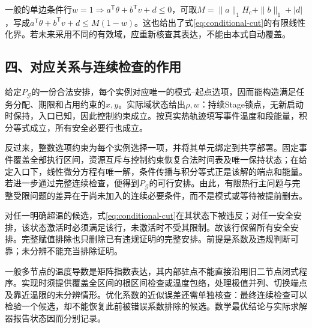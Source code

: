 一般的单边条件行\(w=1\Rightarrow a^{\mathsf T}\theta+b^{\mathsf T}v+d\le0\)，可取\(M=\|a\|_1H_c+\|b\|_1+|d|\)，写成\(a^{\mathsf T}\theta+b^{\mathsf T}v+d\le M(1-w)\)。这也给出了式\eqref{eq:conditional-cut}的有限线性化界。若未来采用不同的有效域，应重新核查其表达，不能由本式自动覆盖。

\subsection*{四、对应关系与连续检查的作用}

给定\(P_{\mathcal G}\)的一份合法安排，每个实例对应唯一的模式--起点选项，因而能构造满足任务分配、期限和占用约束的\(x,y\)。实际域状态给出\(\rho,w\)：持续Stage锁点，无新启动时保持，入口已知，因此控制约束成立。按真实热轨迹填写事件温度和段能量，积分等式成立，所有安全必要行也成立。

反过来，整数选项约束为每个实例选择一项，并将其单元绑定到共享部署。固定事件覆盖全部执行区间，资源互斥与控制约束恢复合法时间表及唯一保持状态；在给定入口下，线性微分方程有唯一解，条件传播与积分等式正是该解的端点和能量。若进一步通过完整连续检查，便得到\(P_{\mathcal G}\)的可行安排。由此，有限热行主问题与完整受限问题的差异在于尚未加入的连续必要条件，而不是模式或等待被提前删去。

对任一明确超温的候选，式\eqref{eq:conditional-cut}在其状态下被违反；对任一安全安排，该状态激活时必须满足该行，未激活时不受其限制。故该行保留所有安全安排。完整赋值排除也只删除已有违规证明的完整安排。前提是系数及违规判断可靠；未分辨不能充当排除证明。

一般多节点的温度导数是矩阵指数表达，其内部驻点不能直接沿用旧二节点闭式程序。实现时须提供覆盖全区间的根区间检查或温度包络，处理极值并列、切换端点及靠近温限的未分辨情形。优化系数的近似误差还需单独核查：最终连续检查可以检验一个候选，却不能恢复此前被错误系数排除的候选。数学最优结论与实际求解器报告状态因而分别记录。
